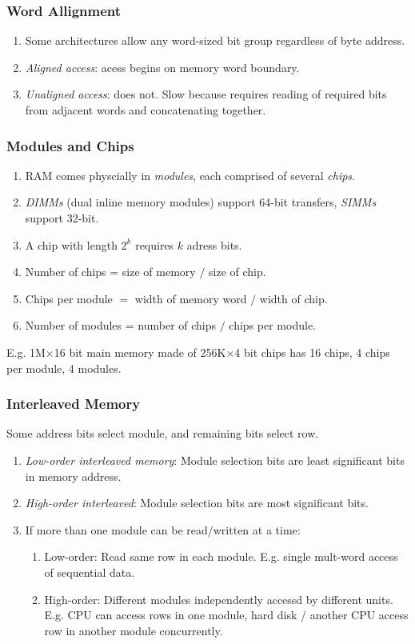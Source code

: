 \documentclass[twocolumn,english]{article}
\begin{document}
\subsubsection{Word Allignment}
\begin{enumerate}
\item Some architectures allow any word-sized bit group regardless of byte
address.
\item \emph{Aligned access}: acess begins on memory word boundary.
\item \emph{Unaligned access}: does not. Slow because requires reading of
required bits from adjacent words and concatenating together.
\end{enumerate}

\subsubsection{Modules and Chips}
\begin{enumerate}
\item RAM comes physcially in \emph{modules}, each comprised of several
\emph{chips}.
\item \emph{DIMMs} (dual inline memory modules) support 64-bit transfers,
\emph{SIMMs} support 32-bit.
\item A chip with length $2^{k}$ requires $k$ adress bits.
\item Number of chips = size of memory $/$ size of chip.
\item Chips per module $=$ width of memory word $/$ width of chip.
\item Number of modules = number of chips $/$ chips per module.
\end{enumerate}
E.g. 1M$\times$16 bit main memory made of 256K$\times$4 bit chips
has 16 chips, 4 chips per module, 4 modules.


\subsubsection{Interleaved Memory}

Some address bits select module, and remaining bits select row.
\begin{enumerate}
\item \emph{Low-order interleaved memory}: Module selection bits are least
significant bits in memory address.
\item \emph{High-order interleaved}: Module selection bits are most significant
bits.
\item If more than one module can be read/written at a time:

\begin{enumerate}
\item Low-order: Read same row in each module. E.g. single mult-word access
of sequential data.
\item High-order: Different modules independently accessd by different units.
E.g. CPU can access rows in one module, hard disk / another CPU access
row in another module concurrently.
\end{enumerate}
\end{enumerate}
\end{document}

